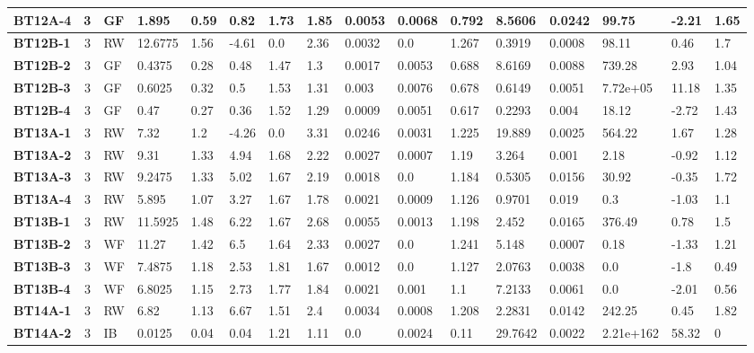 \begin{table}
{\begin{tabular}{l|c|l|l|l|l|l|l|l|l|l|l|l|l|l|l}
    \bfseries BT12A-4 & 3 & GF & 1.895 & 0.59 & 0.82 & 1.73 & 1.85 & 0.0053 & 0.0068 & 0.792 & 8.5606 & 0.0242 & 99.75 & -2.21 & 1.65 \\
    \hline
    \bfseries BT12B-1 & 3 & RW & 12.6775 & 1.56 & -4.61 & 0.0 & 2.36 & 0.0032 & 0.0 & 1.267 & 0.3919 & 0.0008 & 98.11 & 0.46 & 1.7 \\
    \bfseries BT12B-2 & 3 & GF & 0.4375 & 0.28 & 0.48 & 1.47 & 1.3 & 0.0017 & 0.0053 & 0.688 & 8.6169 & 0.0088 & 739.28 & 2.93 & 1.04 \\
    \bfseries BT12B-3 & 3 & GF & 0.6025 & 0.32 & 0.5 & 1.53 & 1.31 & 0.003 & 0.0076 & 0.678 & 0.6149 & 0.0051 & 7.72e+05 & 11.18 & 1.35 \\
    \bfseries BT12B-4 & 3 & GF & 0.47 & 0.27 & 0.36 & 1.52 & 1.29 & 0.0009 & 0.0051 & 0.617 & 0.2293 & 0.004 & 18.12 & -2.72 & 1.43 \\
    \hline
    \bfseries BT13A-1 & 3 & RW & 7.32 & 1.2 & -4.26 & 0.0 & 3.31 & 0.0246 & 0.0031 & 1.225 & 19.889 & 0.0025 & 564.22 & 1.67 & 1.28 \\
    \bfseries BT13A-2 & 3 & RW & 9.31 & 1.33 & 4.94 & 1.68 & 2.22 & 0.0027 & 0.0007 & 1.19 & 3.264 & 0.001 & 2.18 & -0.92 & 1.12 \\
    \bfseries BT13A-3 & 3 & RW & 9.2475 & 1.33 & 5.02 & 1.67 & 2.19 & 0.0018 & 0.0 & 1.184 & 0.5305 & 0.0156 & 30.92 & -0.35 & 1.72 \\
    \bfseries BT13A-4 & 3 & RW & 5.895 & 1.07 & 3.27 & 1.67 & 1.78 & 0.0021 & 0.0009 & 1.126 & 0.9701 & 0.019 & 0.3 & -1.03 & 1.1 \\
    \hline
    \bfseries BT13B-1 & 3 & RW & 11.5925 & 1.48 & 6.22 & 1.67 & 2.68 & 0.0055 & 0.0013 & 1.198 & 2.452 & 0.0165 & 376.49 & 0.78 & 1.5 \\
    \bfseries BT13B-2 & 3 & WF & 11.27 & 1.42 & 6.5 & 1.64 & 2.33 & 0.0027 & 0.0 & 1.241 & 5.148 & 0.0007 & 0.18 & -1.33 & 1.21 \\
    \bfseries BT13B-3 & 3 & WF & 7.4875 & 1.18 & 2.53 & 1.81 & 1.67 & 0.0012 & 0.0 & 1.127 & 2.0763 & 0.0038 & 0.0 & -1.8 & 0.49 \\
    \bfseries BT13B-4 & 3 & WF & 6.8025 & 1.15 & 2.73 & 1.77 & 1.84 & 0.0021 & 0.001 & 1.1 & 7.2133 & 0.0061 & 0.0 & -2.01 & 0.56 \\
    \hline
    \bfseries BT14A-1 & 3 & RW & 6.82 & 1.13 & 6.67 & 1.51 & 2.4 & 0.0034 & 0.0008 & 1.208 & 2.2831 & 0.0142 & 242.25 & 0.45 & 1.82 \\
    \bfseries BT14A-2 & 3 & IB & 0.0125 & 0.04 & 0.04 & 1.21 & 1.11 & 0.0 & 0.0024 & 0.11 & 29.7642 & 0.0022 & 2.21e+162 & 58.32 & 0 \\

\end{tabular}}
\end{table}
